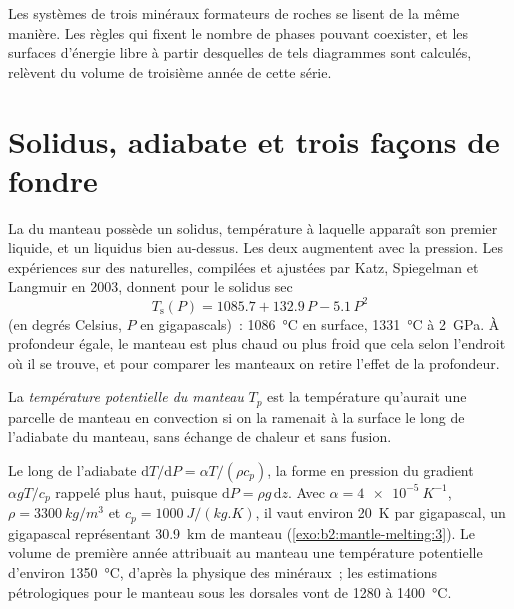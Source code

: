 Les systèmes de trois minéraux formateurs de roches se lisent de la même manière. Les règles qui fixent le nombre de phases pouvant coexister,
et les surfaces d'énergie libre à partir desquelles de tels diagrammes sont calculés, relèvent du
volume de troisième année de cette série.

\section{Solidus, adiabate et trois façons de fondre}\label{sec:b2:mantle-melting:solidus}

La  du manteau possède un solidus, température à laquelle apparaît son premier
liquide, et un liquidus bien au-dessus. Les deux augmentent avec la pression. Les expériences
sur des  naturelles, compilées et ajustées par Katz, Spiegelman et Langmuir en 2003, donnent
pour le solidus sec
\[
  T_{\mathrm{s}}(P) = 1085.7 + 132.9\,P - 5.1\,P^2
\]
(en degrés Celsius, $P$ en gigapascals)~: \qty{1086}{\celsius} en surface,
\qty{1331}{\celsius} à \qty{2}{GPa}. À profondeur égale, le manteau est plus chaud ou
plus froid que cela selon l'endroit où il se trouve, et pour comparer les manteaux on retire
l'effet de la profondeur.

\begin{definition}\label{def:b2:mantle-melting:tp}
La \emph{température potentielle du manteau} $T_p$
est la température qu'aurait une parcelle de manteau en convection si on la ramenait
à la surface le long de l'adiabate du manteau, sans échange de chaleur et
sans fusion.
\end{definition}

Le long de l'adiabate $\mathrm dT/\mathrm dP = \alpha T/(\rho c_p)$, la forme en
pression du gradient $\alpha gT/c_p$ rappelé plus haut, puisque $\mathrm dP = \rho
g\,\mathrm dz$. Avec $\alpha = \qty{4e-5}{K^{-1}}$, $\rho = \qty{3300}{kg/m^3}$
et $c_p = \qty{1000}{J/(kg.K)}$, il vaut environ \qty{20}{K} par gigapascal, un gigapascal
représentant \qty{30.9}{km} de manteau (\cref{exo:b2:mantle-melting:3}). Le volume de première année
attribuait au manteau une température potentielle d'environ \qty{1350}{\celsius}, d'après la physique des
minéraux~; les estimations pétrologiques pour le manteau sous les dorsales vont de 1280 à
\qty{1400}{\celsius}.

